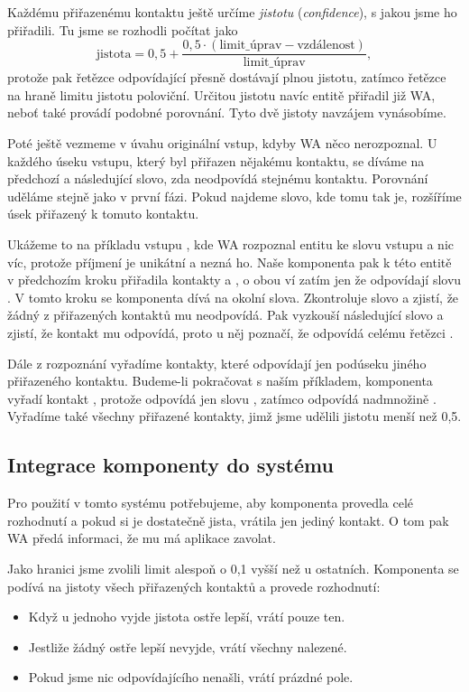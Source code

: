 Každému přiřazenému kontaktu ještě určíme \textit{jistotu} (\textit{confidence}),
s jakou jsme ho přiřadili. Tu jsme se rozhodli počítat jako
\[ \text{jistota} = 0,5 + \frac{0,5 \cdot (\text{limit\_úprav} - \text{vzdálenost})}{\text{limit\_úprav}} ,\]
protože pak řetězce odpovídající přesně dostávají plnou jistotu, zatímco řetězce na
hraně limitu jistotu poloviční. Určitou jistotu navíc entitě přiřadil již WA,
neboť také provádí podobné porovnání. Tyto dvě jistoty navzájem vynásobíme.

Poté ještě vezmeme v úvahu originální vstup, kdyby WA něco nerozpoznal. U každého
úseku vstupu, který byl přiřazen nějakému kontaktu, se díváme na předchozí a následující
slovo, zda neodpovídá stejnému kontaktu. Porovnání uděláme stejně jako v první fázi.
Pokud najdeme slovo, kde tomu tak je, rozšíříme úsek přiřazený k tomuto kontaktu.

Ukážeme
to na příkladu vstupu , kde WA rozpoznal entitu 
ke slovu vstupu  a nic víc, protože příjmení je unikátní a nezná ho.
Naše komponenta pak k této entitě v předchozím kroku přiřadila
kontakty  a , o obou ví zatím jen že odpovídají slovu .
V tomto kroku se komponenta dívá na okolní slova.
Zkontroluje slovo  a zjistí, že žádný z přiřazených kontaktů mu neodpovídá. Pak
vyzkouší následující slovo  a zjistí, že kontakt  mu odpovídá,
proto u něj poznačí, že odpovídá celému řetězci .

Dále z rozpoznání vyřadíme kontakty, které odpovídají jen podúseku jiného
přiřazeného kontaktu. Budeme-li pokračovat s naším příkladem, komponenta vyřadí kontakt ,
protože odpovídá jen slovu , zatímco  odpovídá nadmnožině .
Vyřadíme také
všechny přiřazené kontakty, jimž jsme udělili jistotu menší než 0,5.

\subsection{Integrace komponenty do systému}\label{integration}

Pro použití v tomto systému potřebujeme, aby komponenta provedla
celé rozhodnutí a pokud si je dostatečně jista, vrátila jen jediný kontakt.
O tom pak WA předá informaci, že mu má aplikace zavolat.

Jako hranici  jsme zvolili limit alespoň o 0,1 vyšší než u ostatních.
Komponenta se podívá na jistoty všech přiřazených kontaktů a provede rozhodnutí:
\begin{itemize}
    \item Když u jednoho vyjde jistota ostře lepší, vrátí pouze ten.
    \item Jestliže žádný ostře lepší nevyjde, vrátí všechny nalezené.
    \item Pokud jsme nic odpovídajícího nenašli, vrátí prázdné pole.
\end{itemize}
